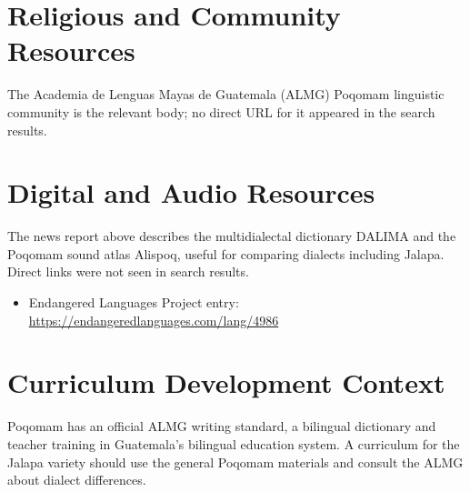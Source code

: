 \documentclass[12pt]{article}
\begin{document}
\section{Religious and Community Resources}
The Academia de Lenguas Mayas de Guatemala (ALMG) Poqomam linguistic community is the relevant body; no direct URL for it appeared in the search results.

\section{Digital and Audio Resources}
The news report above describes the multidialectal dictionary DALIMA and the Poqomam sound atlas Alispoq, useful for comparing dialects including Jalapa. Direct links were not seen in search results.
\begin{itemize}
\item Endangered Languages Project entry: \url{https://endangeredlanguages.com/lang/4986}
\end{itemize}

\section{Curriculum Development Context}
Poqomam has an official ALMG writing standard, a bilingual dictionary and teacher training in Guatemala's bilingual education system. A curriculum for the Jalapa variety should use the general Poqomam materials and consult the ALMG about dialect differences.
\end{document}
